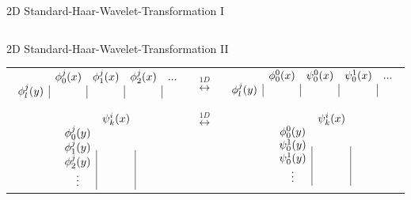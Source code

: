 {\begin{frame}{2D Standard-Haar-Wavelet-Transformation I}
\begin{adjustbox}{max width=\textwidth ,center}
\begin{tabular}{c c c}
\end{tabular}
\end{adjustbox}
\end{frame}

\begin{frame}{2D Standard-Haar-Wavelet-Transformation II}
\begin{adjustbox}{max width=\textwidth ,center}
\begin{tabular}{c c c}
$
\begin{array}{c|c|c|c|c}
 \multicolumn{1}{c}{}& \multicolumn{1}{c}{\phi_{0}^{j}(x)} & \multicolumn{1}{c}{\phi_{1}^{j}(x)} & \multicolumn{1}{c}{\phi_{2}^{j}(x)} & ... \\ \cline{2-5}
 \phi_{l}^{j}(y) & & & & \\ \cline{2-5}
\end{array}
$
&
$\begin{array}{c}
\\ \overset{1D}{\longleftrightarrow} \\
\end{array}$
&
$
\begin{array}{c|c|c|c|c}
 \multicolumn{1}{c}{}& \multicolumn{1}{c}{\phi_{0}^{0}(x)} & \multicolumn{1}{c}{\psi_{0}^{0}(x)} & \multicolumn{1}{c}{\psi_{0}^{1}(x)} & ... \\ \cline{2-5}
 \phi_{l}^{j}(y) & & & & \\ \cline{2-5}
\end{array}
$ 
\\
\\ \hline
\\
$
\begin{array}{c|c|}
 \multicolumn{1}{c}{}& \multicolumn{1}{c}{\psi_{k}^{i}(x)} \\ \cline{2-2}
 \phi_{0}^{j}(y) & \\ \cline{2-2}
 \phi_{1}^{j}(y) & \\ \cline{2-2}
 \phi_{2}^{j}(y) & \\ \cline{2-2}
 \vdots & 
\end{array}
$
&
$\overset{1D}{\longleftrightarrow}$
&
$
\begin{array}{c|c|}
 \multicolumn{1}{c}{}& \multicolumn{1}{c}{\psi_{k}^{i}(x)} \\ \cline{2-2}
 \phi_{0}^{0}(y) & \\ \cline{2-2}
 \psi_{0}^{1}(y) & \\ \cline{2-2}
 \psi_{0}^{1}(y) & \\ \cline{2-2}
 \vdots & 
\end{array}
$ 
\end{tabular}
\end{adjustbox}
\end{frame}

}

